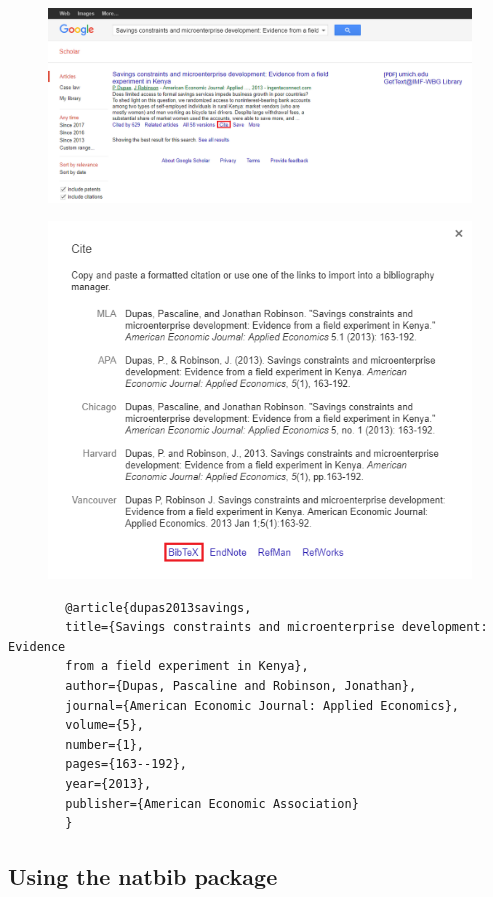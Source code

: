 \documentclass[12pts]{article}
\begin{document}
	\begin{figure}[H]
		\centering
		\includegraphics[width=\linewidth]{../img/scholar_cite}
	\end{figure}

	\begin{figure}[H]
		\centering
		\includegraphics[width=.8\linewidth]{../img/scholar_bibtex}
	\end{figure}

	\begin{Verbatim}
		@article{dupas2013savings,
		title={Savings constraints and microenterprise development: Evidence 
		from a field experiment in Kenya},
		author={Dupas, Pascaline and Robinson, Jonathan},
		journal={American Economic Journal: Applied Economics},
		volume={5},
		number={1},
		pages={163--192},
		year={2013},
		publisher={American Economic Association}
		}
	\end{Verbatim}
	
	\subsection{Using the natbib package}
	
\end{document}
